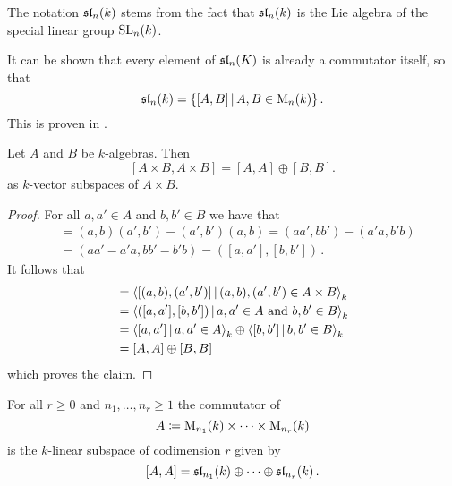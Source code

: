 \begin{remark}
  The notation $\operatorname{\mathfrak{sl}}_n(k)$ stems from the fact that $\operatorname{\mathfrak{sl}}_n(k)$ is the Lie algebra of the special linear group $\operatorname{SL}_n(k)$.
\end{remark}


\begin{remark}
  It can be shown that every element of $\operatorname{\mathfrak{sl}}_n(K)$ is already a commutator itself, so that
  \[
      \sllie_n(k)
    = \{ [A,B] \suchthat A, B \in \Mat_n(k) \} \,.
  \]
  This is proven in \cite{TraceZero}.
\end{remark}


\begin{lemma}
  Let $A$ and $B$ be $k$-algebras.
  Then
  \[
      [A \times B, A \times B]
    = [A,A] \oplus [B,B].
  \]
  as $k$-vector subspaces of $A \times B$.
\end{lemma}
\begin{proof}
  For all $a, a' \in A$ and $b, b' \in B$ we have that
  \begin{align*}
        [(a,b),(a',b')]
    &=  (a,b)(a',b') - (a',b')(a,b)
     =  (aa',bb') - (a'a, b'b) \\
    &=  (aa'-a'a, bb' - b'b)
     =  ([a,a'], [b,b']) \,.
  \end{align*}
  It follows that
  \begin{align*}
        [A \times B, A \times B]
    &=  \gen{
          [(a,b), (a',b')]
        \suchthat
          (a,b), (a',b') \in A \times B
        }_k \\
    &= \gen{
          ([a,a'], [b,b'])
        \suchthat
          a, a' \in A
          \text{ and }
          b, b' \in B
        }_k \\
    &=  \gen{ [a,a'] \suchthat a, a' \in A }_k
        \oplus
        \gen{ [b,b'] \suchthat b, b' \in B }_k \\
    &= [A,A] \oplus [B,B]
  \end{align*}
  which proves the claim.
\end{proof}


\begin{corollary}
  \label{corollary: commutator product of matrix algebras}
  For all $r \geq 0$ and $n_1, \dots, n_r \geq 1$ the commutator of
  \[
              A
     \coloneqq \operatorname{M}_{n_1}(k) \times \dotsb \times  \operatorname{M}_{n_r}(k)
  \]
  is the $k$-linear subspace of codimension $r$ given by
  \[
        [A,A]
     =  \operatorname{\mathfrak{sl}}_{n_1}(k) \oplus \dotsb \oplus \operatorname{\mathfrak{sl}}_{n_r}(k) \,.
  \]
\end{corollary}


